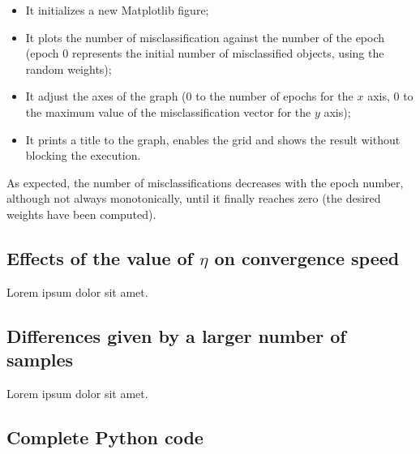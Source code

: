 \documentclass[letterpaper,headings=standardclasses]{scrartcl}
\begin{document}
\begin{itemize}

\item It initializes a new Matplotlib figure;

\item It plots the number of misclassification against the number of the epoch (epoch 0 represents the initial number of misclassified objects, using the random weights);

\item It adjust the axes of the graph (0 to the number of epochs for the $x$ axis, 0 to the maximum value of the misclassification vector for the $y$ axis);

\item It prints a title to the graph, enables the grid and shows the result without blocking the execution.

\end{itemize}

As expected, the number of misclassifications decreases with the epoch number, although not always monotonically, until it finally reaches zero (the desired weights have been computed).

\subsection{Effects of the value of $\eta$ on convergence speed}

Lorem ipsum dolor sit amet.

\subsection{Differences given by a larger number of samples}

Lorem ipsum dolor sit amet.

\subsection{Complete Python code}


\end{document}
